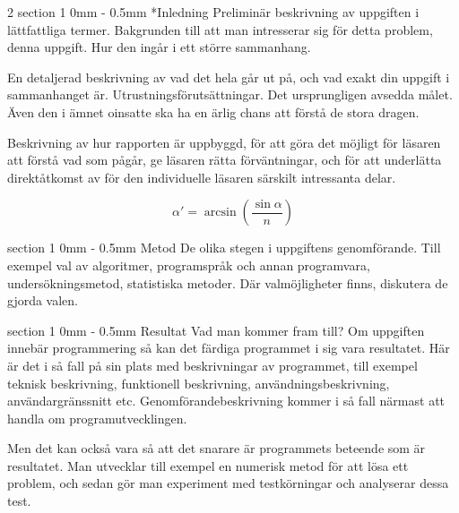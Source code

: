 \documentclass[a4paper]{article}
\makeatletter
\renewcommand{\section}{\@startsection
{section}%
{1}%
{0mm}%
{-\baselineskip}%
{0.5mm}%
{\normalfont\bfseries}} %
\makeatother
\begin{document}
\begin{multicols}{2}
  \section*{Inledning}
  Preliminär beskrivning av uppgiften  i lättfattliga termer. Bakgrunden
  till att man intresserar sig för detta problem, denna uppgift. Hur den
  ingår i ett större sammanhang.

  En detaljerad beskrivning av vad det hela går ut på, och vad exakt din
  uppgift   i    sammanhanget   är.    Utrustningsförutsättningar.   Det
  ursprungligen avsedda målet. Även den i ämnet oinsatte ska ha en ärlig
  chans att förstå de stora dragen.

  Beskrivning av hur rapporten är uppbyggd, för att göra det möjligt för
  läsaren att förstå vad som  pågår, ge läsaren rätta förväntningar, och
  för  att  underlätta direktåtkomst  av  för  den individuelle  läsaren
  särskilt intressanta delar.
  
  \begin{equation}
  \alpha' = \arcsin\left(\frac{\sin\alpha}{n}\right)
  \end{equation}

  \section{Metod}
  De  olika  stegen  i  uppgiftens genomförande.  Till  exempel  val  av
  algoritmer,  programspråk och  annan programvara,  undersökningsmetod,
  statistiska  metoder. Där  valmöjligheter finns,  diskutera de  gjorda
  valen.

  \section{Resultat}
  Vad man  kommer fram till?  Om uppgiften innebär programmering  så kan
  det färdiga programmet i sig vara resultatet.  Här är det i så fall på
  sin  plats  med  beskrivningar  av programmet,  till  exempel  teknisk
  beskrivning,    funktionell    beskrivning,    användningsbeskrivning,
  användargränssnitt  etc.  Genomförandebeskrivning  kommer  i  så  fall
  närmast att handla om programutvecklingen.

  Men det kan också vara så  att det snarare är programmets beteende som
  är resultatet.  Man utvecklar till  exempel en numerisk metod  för att
  lösa ett problem,  och sedan gör man experiment  med testkörningar och
  analyserar dessa test.


\end{multicols}
\end{document}
